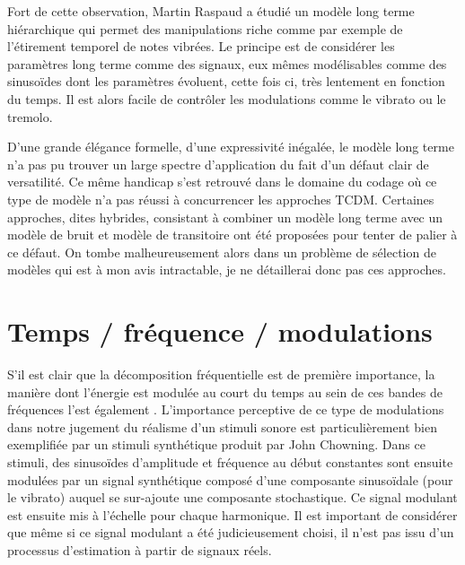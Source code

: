 Fort de cette observation, Martin Raspaud a étudié un modèle long terme hiérarchique qui permet des manipulations riche comme par exemple de l'étirement temporel de notes vibrées\cite{raspaud2007modeles}. Le principe est de considérer les paramètres long terme comme des signaux, eux mêmes modélisables comme des sinusoïdes dont les paramètres évoluent, cette fois ci, très lentement en fonction du temps. Il est alors facile de contrôler les modulations comme le vibrato ou le tremolo.

D'une grande élégance formelle, d'une expressivité inégalée, le modèle long terme n'a pas pu trouver un large spectre d'application du fait d'un défaut clair de versatilité. Ce même handicap s'est retrouvé dans le domaine du codage où ce type de modèle\cite{den2002parametric} n'a pas réussi à concurrencer les approches TCDM. Certaines approches, dites hybrides, consistant à combiner un modèle long terme avec un modèle de bruit et modèle de transitoire ont été proposées pour tenter de palier à ce défaut. On tombe malheureusement alors dans un problème de sélection de modèles qui est à mon avis intractable, je ne détaillerai donc pas ces approches.




\section{ \nmu Temps / fréquence / modulations}  \label{sec:tfm}

S'il est clair que la décomposition fréquentielle est de première importance, la manière dont l'énergie est modulée au court du temps au sein de ces bandes de fréquences l'est également . L'importance perceptive de ce type de modulations dans notre jugement du réalisme d'un stimuli sonore est particulièrement bien exemplifiée par un stimuli synthétique produit par John Chowning. Dans ce stimuli, des sinusoïdes d'amplitude et fréquence au début constantes sont ensuite modulées par un signal synthétique composé d'une composante sinusoïdale (pour le vibrato) auquel se sur-ajoute une composante stochastique. Ce signal modulant est ensuite mis à l'échelle pour chaque harmonique. Il est important de considérer que même si ce signal modulant a été judicieusement choisi, il n'est pas issu d'un processus d'estimation à partir de signaux réels.

